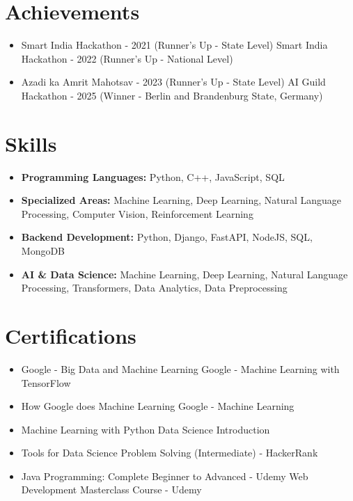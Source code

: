 \documentclass[a4paper,10pt]{article}
\begin{document}
\section*{Achievements}
\begin{itemize}
\item Smart India Hackathon - 2021 (Runner's Up - State Level) \hfill Smart India Hackathon - 2022 (Runner's Up - National Level)
\item Azadi ka Amrit Mahotsav - 2023 (Runner's Up - State Level) \hfill AI Guild Hackathon - 2025 (Winner - Berlin and Brandenburg State, Germany)
\end{itemize}

\section*{Skills}
\begin{itemize}
  \item \textbf{Programming Languages:} Python, C++, JavaScript, SQL
  \item \textbf{Specialized Areas:} Machine Learning, Deep Learning, Natural Language Processing, Computer Vision, Reinforcement Learning
  \item \textbf{Backend Development:} Python, Django, FastAPI, NodeJS, SQL, MongoDB
  \item \textbf{AI \& Data Science:} Machine Learning, Deep Learning, Natural Language Processing, Transformers, Data Analytics, Data Preprocessing
\end{itemize}

\section*{Certifications}
\begin{itemize}
\item Google - Big Data and Machine Learning \hfill Google - Machine Learning with TensorFlow
\item How Google does Machine Learning \hfill Google - Machine Learning
\item Machine Learning with Python \hfill Data Science Introduction
\item Tools for Data Science \hfill Problem Solving (Intermediate) - HackerRank
\item Java Programming: Complete Beginner to Advanced - Udemy \hfill Web Development Masterclass Course - Udemy
\end{itemize}
\end{document}
